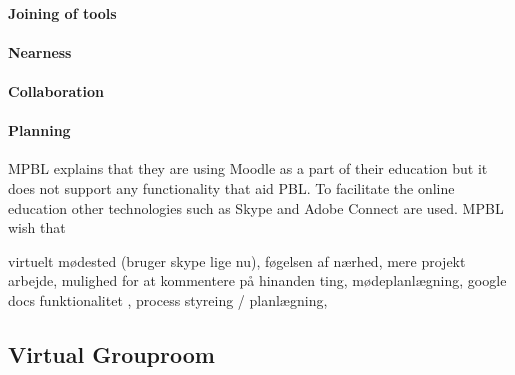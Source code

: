 \paragraph{Joining of tools}

\paragraph{Nearness}
\paragraph{Collaboration}
\paragraph{Planning}




MPBL explains that they are using Moodle as a part of their education but it does not support any functionality that aid PBL. 
To facilitate the online education other technologies such as Skype\cite{skype} and Adobe Connect\cite{adobe} are used. MPBL wish that        

virtuelt mødested (bruger skype lige nu), føgelsen af nærhed, mere projekt arbejde, mulighed for at kommentere på hinanden ting, mødeplanlægning, google docs funktionalitet , process styreing / planlægning, 

\subsection{Virtual Grouproom}


\begin{comment}
In the preliminary phase of working with Electronic-learning (E-learning) it is important for us to ensure that we are in fact working with problems that are relevant in the E-learning and Problem Based Learning (PBL) fields of study, as we are aiming at improving the overall way that the chosen E-learning environment at Aalborg University (AAU), namely Moodle, supports PBL. 
Because AAU is renowned for its implementation of PBL, we do not have to look very far to find some of the leading experts in this field.
\end{comment}
\begin{comment}
To optian domain knowlage of how moodle and Aapbl works 
Domain knowlage
In the initial phase of this project we conducted two interviews with xxx from ELSA\cite{x} and yyy from MPBL. 

interviews
*ELSA
*MPBL

*Baseret på de ting de fortalte ->
*Kommunication
* 
*Fildeling

Opdeling i de 4 områder

*akritektur
\end{comment}

